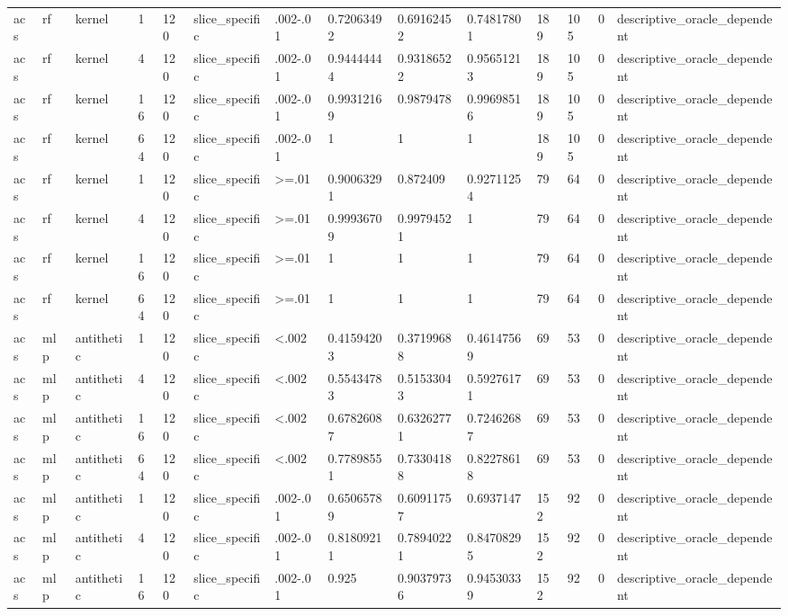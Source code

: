 \begin{tabular}{llllllllllllll}
acs & rf & kernel & 1 & 120 & slice\_specific & .002-.01 & 0.72063492 & 0.69162452 & 0.74817801 & 189 & 105 & 0 & descriptive\_oracle\_dependent \\
acs & rf & kernel & 4 & 120 & slice\_specific & .002-.01 & 0.94444444 & 0.93186522 & 0.95651213 & 189 & 105 & 0 & descriptive\_oracle\_dependent \\
acs & rf & kernel & 16 & 120 & slice\_specific & .002-.01 & 0.99312169 & 0.9879478 & 0.99698516 & 189 & 105 & 0 & descriptive\_oracle\_dependent \\
acs & rf & kernel & 64 & 120 & slice\_specific & .002-.01 & 1 & 1 & 1 & 189 & 105 & 0 & descriptive\_oracle\_dependent \\
acs & rf & kernel & 1 & 120 & slice\_specific & >=.01 & 0.90063291 & 0.872409 & 0.92711254 & 79 & 64 & 0 & descriptive\_oracle\_dependent \\
acs & rf & kernel & 4 & 120 & slice\_specific & >=.01 & 0.99936709 & 0.99794521 & 1 & 79 & 64 & 0 & descriptive\_oracle\_dependent \\
acs & rf & kernel & 16 & 120 & slice\_specific & >=.01 & 1 & 1 & 1 & 79 & 64 & 0 & descriptive\_oracle\_dependent \\
acs & rf & kernel & 64 & 120 & slice\_specific & >=.01 & 1 & 1 & 1 & 79 & 64 & 0 & descriptive\_oracle\_dependent \\
acs & mlp & antithetic & 1 & 120 & slice\_specific & <.002 & 0.41594203 & 0.37199688 & 0.46147569 & 69 & 53 & 0 & descriptive\_oracle\_dependent \\
acs & mlp & antithetic & 4 & 120 & slice\_specific & <.002 & 0.55434783 & 0.51533043 & 0.59276171 & 69 & 53 & 0 & descriptive\_oracle\_dependent \\
acs & mlp & antithetic & 16 & 120 & slice\_specific & <.002 & 0.67826087 & 0.63262771 & 0.72462687 & 69 & 53 & 0 & descriptive\_oracle\_dependent \\
acs & mlp & antithetic & 64 & 120 & slice\_specific & <.002 & 0.77898551 & 0.73304188 & 0.82278618 & 69 & 53 & 0 & descriptive\_oracle\_dependent \\
acs & mlp & antithetic & 1 & 120 & slice\_specific & .002-.01 & 0.65065789 & 0.60911757 & 0.6937147 & 152 & 92 & 0 & descriptive\_oracle\_dependent \\
acs & mlp & antithetic & 4 & 120 & slice\_specific & .002-.01 & 0.81809211 & 0.78940221 & 0.84708295 & 152 & 92 & 0 & descriptive\_oracle\_dependent \\
acs & mlp & antithetic & 16 & 120 & slice\_specific & .002-.01 & 0.925 & 0.90379736 & 0.94530339 & 152 & 92 & 0 & descriptive\_oracle\_dependent \\

\end{tabular}
